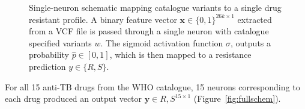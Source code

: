 \begin{figure}[htbp]
  \caption{Single-neuron schematic mapping catalogue variants to a single drug resistant profile. A binary feature vector $\mathbf{x}\in\{0,1\}^{26k\times1}$ extracted from a VCF file is passed through a single neuron with catalogue specified variants $w$. The sigmoid activation function $\sigma$, outputs a probability $\hat{p}\in [0,1]$, which is then mapped to a resistance prediction $y\in \{R,S\}$.}
  \label{fig:onescheme}
\end{figure}

For all 15 anti-TB drugs from the WHO catalogue, 15 neurons corresponding to each drug produced an output vector $\mathbf{y}\in {R,S}^{15\times1}$ (Figure~\ref{fig:fullschem}).

